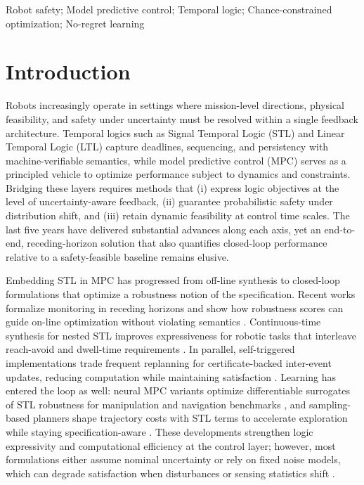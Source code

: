 \documentclass[journal]{IEEEtran}
\theoremstyle{definition}
\begin{document}
\begin{IEEEkeywords}
Robot safety; Model predictive control; Temporal logic; Chance-constrained optimization; No-regret learning
\end{IEEEkeywords}


 

%
{}
\section{Introduction}

Robots increasingly operate in settings where mission-level directions, physical feasibility, and safety under uncertainty must be resolved within a single feedback architecture. Temporal logics such as Signal Temporal Logic (STL) and Linear Temporal Logic (LTL) capture deadlines, sequencing, and persistency with machine-verifiable semantics, while model predictive control (MPC) serves as a principled vehicle to optimize performance subject to dynamics and constraints. Bridging these layers requires methods that (i) express logic objectives at the level of uncertainty-aware feedback, (ii) guarantee probabilistic safety under distribution shift, and (iii) retain dynamic feasibility at control time scales. The last five years have delivered substantial advances along each axis, yet an end-to-end, receding-horizon solution that also quantifies closed-loop performance relative to a safety-feasible baseline remains elusive.

 
Embedding STL in MPC has progressed from off-line synthesis to closed-loop formulations that optimize a robustness notion of the specification. Recent works formalize monitoring in receding horizons and show how robustness scores can guide on-line optimization without violating semantics \cite{Yu2024Automatica_STL_MPM}. Continuous-time synthesis for nested STL improves expressiveness for robotic tasks that interleave reach-avoid and dwell-time requirements \cite{Yu2024TRO_NestedSTL}. In parallel, self-triggered implementations trade frequent replanning for certificate-backed inter-event updates, reducing computation while maintaining satisfaction \cite{Huang2024CASE_SelfTrigSTL}. Learning has entered the loop as well: neural MPC variants optimize differentiable surrogates of STL robustness for manipulation and navigation benchmarks \cite{Meng2023RAL_STL_NPC}, and sampling-based planners shape trajectory costs with STL terms to accelerate exploration while staying specification-aware \cite{Chen2025RAL_STL_MPPI}. These developments strengthen logic expressivity and computational efficiency at the control layer; however, most formulations either assume nominal uncertainty or rely on fixed noise models, which can degrade satisfaction when disturbances or sensing statistics shift \cite{Yang2024CEP_STL_MPC}.
\end{document}
